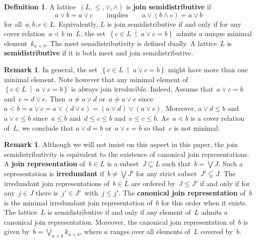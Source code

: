 \documentclass{amsart}
\theoremstyle{definition}
\newtheorem{definition}[theorem]{Definition}
\newtheorem{remark}[theorem]{Remark}
\newcommand{\set}[2]{\left\{ #1 \;\middle|\; #2 \right\}} %
\newcommand{\defn}[1]{\textbf{\textsf{\color{PineGreen} #1}}} %
\newcommand{\meet}{\wedge} %
\newcommand{\join}{\vee} %
\newcommand{\bigJoin}{\bigvee} %
\begin{document}
\begin{definition}
A lattice~$(L, \le , \join, \meet)$ is \defn{join semidistributive} if
\[
a \join b = a \join c
\qquad\text{implies}\qquad
a \join (b \meet c) = a \join b
\]
for all~$a,b,c \in L$.
Equivalently, $L$ is join semidistributive if and only if for any cover relation~$a \lessdot b$ in~$L$, the set~$\set{c \in L}{a \join c = b}$ admits a unique minimal element~$k_{a \lessdot b}$.
The meet semidistributivity is defined dually.
A lattice~$L$ is \defn{semidistributive} if it is both meet and join semidistributive.
\end{definition}

\begin{remark}
\label{rem:semidistributiveCriterion}
In general, the set~$\set{c \in L}{a \join c = b}$ might have more than one minimal element.
Note however that any minimal element of~$\set{c \in L}{a \join c = b}$ is always join irreducible.
Indeed, Assume that~$a \join c = b$ and~$c = d \join e$.
Then~$a \ne a \join d$ or~$a \ne a \join e$ since~$a < b = a \join c = a \join (d \join e) = (a \join d) \join (a \join e)$.
Moreover, $a \join d \le b$ and~$a \join e \le b$ since~$a \le b$ and~$d \le c \le b$ and~$e \le c \le b$.
As~$a \lessdot b$ is a cover relation of~$L$, we conclude that $a \join d = b$ or~$a \join e = b$ so that~$c$ is not minimal.
\end{remark}

\begin{remark}
Although we will not insist on this aspect in this paper, the join semidistributivity is equivalent to the existence of canonical join representations.
A \defn{join representation} of~${b \in L}$ is a subset~$J \subseteq L$ such that~$b = \bigJoin J$.
Such a representation is \defn{irredundant} if~$b \ne \bigJoin J'$ for any strict subset~$J' \subsetneq J$.
The irredundant join representations of~$b \in L$ are ordered by~$J \le J'$ if and only if for any~$j \in J$ there is~${j' \in J'}$~with~$j \le j'$.
The \defn{canonical join representation} of~$b$ is the minimal irredundant join representation of~$b$ for this order when it exists.
The lattice~$L$ is semidistributive if and only if any element of~$L$ admits a canonical join representation.
Moreover, the canonical join representation of~$b$ is given by~$b = \bigJoin_{a \lessdot b} k_{a \lessdot b}$, where $a$ ranges over all elements of~$L$ covered by~$b$.
\end{remark}
\end{document}
